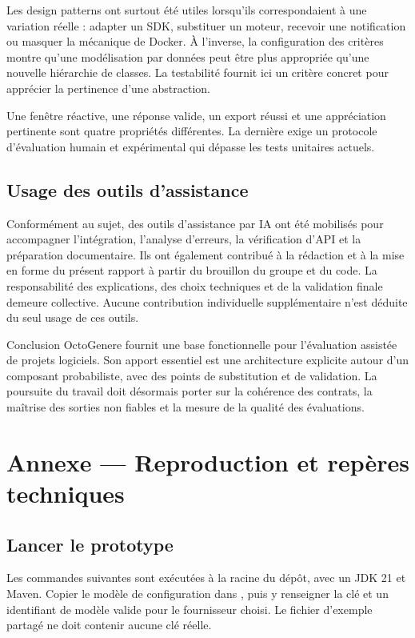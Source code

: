 Les design patterns ont surtout été utiles lorsqu'ils correspondaient à une variation réelle : adapter un SDK, substituer un moteur, recevoir une notification ou masquer la mécanique de Docker. À l'inverse, la configuration des critères montre qu'une modélisation par données peut être plus appropriée qu'une nouvelle hiérarchie de classes. La testabilité fournit ici un critère concret pour apprécier la pertinence d'une abstraction.

Une fenêtre réactive, une réponse valide, un export réussi et une appréciation pertinente sont quatre propriétés différentes. La dernière exige un protocole d'évaluation humain et expérimental qui dépasse les tests unitaires actuels.

\subsection{Usage des outils d'assistance}
Conformément au sujet, des outils d'assistance par IA ont été mobilisés pour accompagner l'intégration, l'analyse d'erreurs, la vérification d'API et la préparation documentaire. Ils ont également contribué à la rédaction et à la mise en forme du présent rapport à partir du brouillon du groupe et du code. La responsabilité des explications, des choix techniques et de la validation finale demeure collective. Aucune contribution individuelle supplémentaire n'est déduite du seul usage de ces outils.

\begin{pointcle}{Conclusion}
OctoGenere fournit une base fonctionnelle pour l'évaluation assistée de projets logiciels. Son apport essentiel est une architecture explicite autour d'un composant probabiliste, avec des points de substitution et de validation. La poursuite du travail doit désormais porter sur la cohérence des contrats, la maîtrise des sorties non fiables et la mesure de la qualité des évaluations.
\end{pointcle}

\clearpage
\section*{Annexe — Reproduction et repères techniques}
\label{sec:annexe}
\subsection*{Lancer le prototype}
Les commandes suivantes sont exécutées à la racine du dépôt, avec un JDK 21 et Maven. Copier le modèle de configuration dans , puis y renseigner la clé et un identifiant de modèle valide pour le fournisseur choisi. Le fichier d'exemple partagé ne doit contenir aucune clé réelle.

